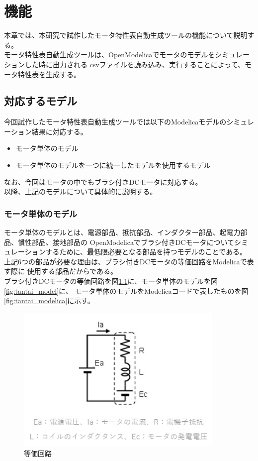 \chapter{機能}\label{cha:Function}

本章では、本研究で試作したモータ特性表自動生成ツールの機能について説明する。\\

モータ特性表自動生成ツールは、OpenModelicaでモータのモデルをシミュレーションした時に出力される
csvファイルを読み込み、実行することによって、モータ特性表を生成する。\\

\section{対応するモデル}\label{taioumodel}
今回試作したモータ特性表自動生成ツールでは以下のModelicaモデルのシミュレーション結果に対応する。
\begin{itemize}
	\item モータ単体のモデル
	\item モータ単体のモデルを一つに統一したモデルを使用するモデル
\end{itemize}
なお、今回はモータの中でもブラシ付きDCモータに対応する。\\
以降、上記のモデルについて具体的に説明する。

\subsection{モータ単体のモデル}\label{sec:sub1}
モータ単体のモデルとは、電源部品、抵抗部品、インダクター部品、起電力部品、慣性部品、接地部品の
OpenModelicaでブラシ付きDCモータについてシミュレーションするために、最低限必要となる部品を持つモデルのことである。\\
上記6つの部品が必要な理由は、ブラシ付きDCモータの等価回路\cite{等価回路}をModelicaで表す際に
使用する部品\cite{modelicaシステム本}だからである。\\
ブラシ付きDCモータの等価回路を図\ref{fig:touka}に、モータ単体のモデルを図\ref{fig:tantai_model}に、
モータ単体のモデルをModelicaコードで表したものを図\ref{fig:tantai_modelica}に示す。

\begin{figure}[t]
	\centering
	\includegraphics[width=10cm]{./Image/touka.png}
	\caption{等価回路}
	\label{fig:touka}
  \end{figure}

